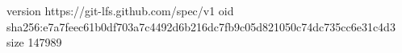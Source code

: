 version https://git-lfs.github.com/spec/v1
oid sha256:e7a7feec61b0df703a7c4492d6b216dc7fb9c05d821050c74dc735cc6e31c4d3
size 147989
